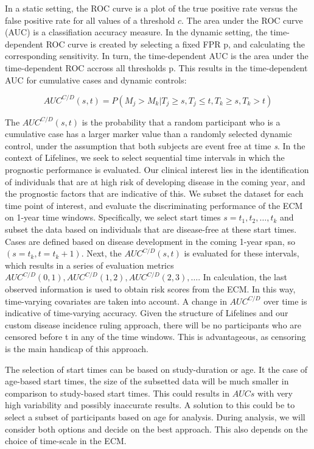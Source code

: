 In a static setting, the ROC curve is a plot of the true positive rate versus the false positive rate for all values of a threshold $c$. The area under the ROC curve (AUC) is a classifiation accuracy measure. In the dynamic setting, the time-dependent ROC curve is created by selecting a fixed FPR p, and calculating the corresponding sensitivity. In turn, the time-dependent AUC is the area under the time-dependent ROC accross all thresholds p. This results in the time-dependent AUC for cumulative cases and dynamic controls:  

$$AUC^{C/D}(s,t) = P(M_j > M_k | T_j \geq s, T_j \leq t, T_k \geq s, T_k > t)$$

The $AUC^{C/D}(s,t)$ is the probability that a random participant who is a cumulative case has a larger marker value than a randomly selected dynamic control, under the assumption that both subjects are event free at time \textit{s}. In the context of Lifelines, we seek to select sequential time intervals in which the prognostic performance is evaluated. Our clinical interest lies in the identification of individuals that are at high risk of developing disease in the coming year, and the prognostic factors that are indicative of this. We subset the dataset for each time point of interest, and evaluate the discriminating performance of the ECM on 1-year time windows. Specifically, we select start times $s = t_1, t_2,\dots, t_k$ and subset the data based on individuals that are disease-free at these start times. Cases are defined based on disease development in the coming 1-year span, so $(s= t_k, t = t_k +1)$. Next, the $AUC^{C/D}(s,t)$ is evaluated for these intervals, which results in a series of evaluation metrics $AUC^{C/D}(0,1), AUC^{C/D}(1,2), AUC^{C/D}(2,3), \dots$. In calculation, the last observed information is used to obtain risk scores from the ECM. In this way, time-varying covariates are taken into account. A change in $AUC^{C/D}$ over time is indicative of time-varying accuracy. Given the structure of Lifelines and our custom disease incidence ruling approach, there will be no participants who are censored before t in any of the time windows. This is advantageous, as censoring is the main handicap of this approach. 

The selection of start times can be based on study-duration or age. It the case of age-based start times, the size of the subsetted data will be much smaller in comparison to study-based start times. This could results in $AUCs$ with very high variability and possibly inaccurate results. A solution to this could be to select a subset of participants based on age for analysis. During analysis, we will consider both options and decide on the best approach. This also depends on the choice of time-scale in the ECM. 

